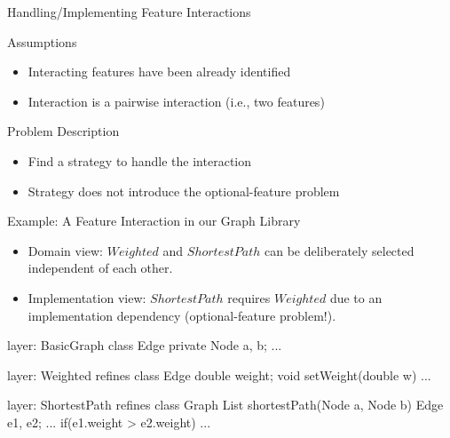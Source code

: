 \begin{frame}{Handling/Implementing Feature Interactions}
	\begin{mycolumns}[widths={50,50},animation=none]
		\begin{note}{Assumptions}
			\begin{itemize}
				\item Interacting features have been already identified
				\item Interaction is a pairwise interaction (i.e., two features)
			\end{itemize}
		\end{note}
	\mynextcolumn
		\begin{definition}{Problem Description}
			\begin{itemize}
				\item Find a strategy to handle the interaction 
				\item Strategy does not introduce the optional-feature problem
			\end{itemize}
		\end{definition}
	\end{mycolumns}
\end{frame}

\begin{frame}[fragile]{Example: A Feature Interaction in our Graph Library}
	\begin{mycolumns}[widths={50,50},animation=none]
		\begin{exampletight}{}
			\centering
		\end{exampletight}
		\vspace{3mm}
		\begin{note}{}
			\begin{itemize}
				\item Domain view: $Weighted$ and $ShortestPath$ can be deliberately selected independent of each other.
				\item Implementation view: $ShortestPath$ requires $Weighted$ due to an implementation dependency (optional-feature problem!).
			\end{itemize}
		\end{note}
	\mynextcolumn
{\small
\begin{codetight}{layer: BasicGraph}
class Edge {
	private Node a, b;
	...
}
\end{codetight}	
\begin{codetight}{layer: Weighted}
refines class Edge {
	double weight;
	void setWeight(double w){ ... }
}
\end{codetight}	
\begin{codetight}{layer: ShortestPath}
refines class Graph {
	List shortestPath(Node a, Node b){
		Edge e1, e2;
		...
		if(e1.weight > e2.weight) 
		... 
	}
}
\end{codetight}	
}
	\end{mycolumns}
\end{frame}

